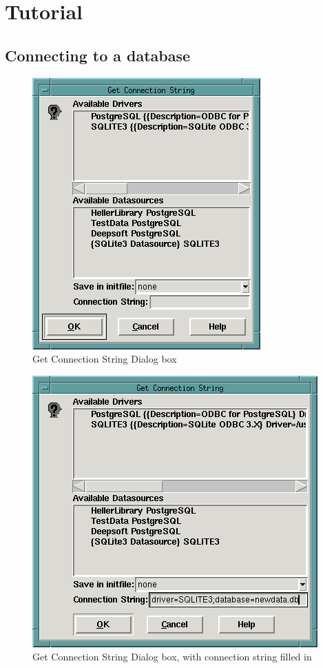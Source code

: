 \chapter{Tutorial}
\label{chpt:Tutorial}

\section{Connecting to a database}

\begin{figure}[hpt]
\begin{centering}
\includegraphics{GetConnectionStringDialog.png}
\caption{Get Connection String Dialog box}
\label{fig:tut:getconnectionstring}
\end{centering}
\end{figure}
\begin{figure}[hpt]
\begin{centering}
\includegraphics{GetConnectionStringDialogSQLite.png}
\caption{Get Connection String Dialog box, with connection string filled in}
\label{fig:tut:getconnectionstringsqlite}
\end{centering}
\end{figure}
